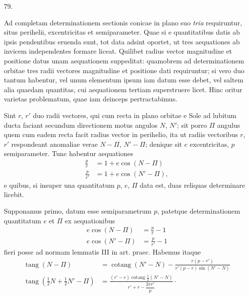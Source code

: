 \medskip
\hypertarget{native-108-article079}{}
\begin{center}79.\end{center}
Ad completam determinationem sectionis conicae in plano suo \emph{tria} requiruntur, situs perihelii, excentricitas et semiparameter. Quae si e quantitatibus datis ab ipsis pendentibus eruenda sunt, tot data adsint oportet, ut tres aequationes ab invicem independentes formare liceat. Quilibet radius vector magnitudine et positione datus unam aequationem suppeditat: quamobrem ad determinationem orbitae tres radii vectores magnitudine et positione dati requiruntur; si vero duo tantum habentur, vel unum elementum ipsum iam datum esse debet, vel saltem alia quaedam quantitas, cui aequationem tertiam superstruere licet. Hinc oritur varietas problematum, quae iam deinceps pertractabimus.
\par
Sint $r$, $r'$ duo radii vectores, qui cum recta in plano orbitae e Sole ad lubitum ducta faciant secundum directionem motus angulos $N$, $N'$; sit porro $\Pi$ angulus quem cum eadem recta facit radius vector in perihelio, ita ut radiis vectoribus $r$, $r'$ respondeant anomaliae verae $N-\Pi$, $N'-\Pi$; denique sit $e$ excentricitas, $p$ semiparameter. Tunc habentur aequationes
\[
\begin{aligned}
\frac{p}{r}&=1+e\cos(N-\Pi)\\
\frac{p}{r'}&=1+e\cos(N'-\Pi),
\end{aligned}
\]
e quibus, si insuper una quantitatum $p$, $e$, $\Pi$ data est, duas reliquas determinare licebit.
\par
Supponamus primo, datum esse semiparametrum $p$, patetque determinationem quantitatum $e$ et $\Pi$ ex aequationibus
\[
\begin{aligned}
e\cos(N-\Pi)&=\frac{p}{r}-1\\
e\cos(N'-\Pi)&=\frac{p}{r'}-1
\end{aligned}
\]
fieri posse ad normam lemmatis III in art. praec. Habemus itaque
\[
\begin{aligned}
\operatorname{tang}(N-\Pi)&=\operatorname{cotang}(N'-N)-\frac{r(p-r')}{r'(p-r)\sin(N'-N)}\\[5pt]
\operatorname{tang}(\tfrac12N+\tfrac12N'-\Pi)&=\frac{(r'-r)\operatorname{cotang}\tfrac12(N'-N)}{r'+r-\dfrac{2rr'}{p}}\mathpunct{\cdot}
\end{aligned}
\]
